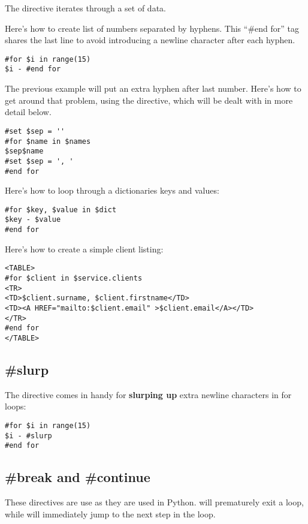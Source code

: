 The  directive iterates through a set of data.

Here's how to create list of numbers separated by hyphens. This ``\#end for''
tag shares the last line to avoid introducing a newline character after each
hyphen.  
\begin{verbatim}
#for $i in range(15)
$i - #end for
\end{verbatim}

The previous example will put an extra hyphen after last number.  Here's how to
get around that problem, using the  directive, which will be dealt
with in more detail below.
\begin{verbatim}
#set $sep = '' 
#for $name in $names 
$sep$name 
#set $sep = ', ' 
#end for 
\end{verbatim}

Here's how to loop through a dictionaries keys and values:
\begin{verbatim}
#for $key, $value in $dict
$key - $value
#end for
\end{verbatim}

Here's how to create a simple client listing:
\begin{verbatim}
<TABLE>
#for $client in $service.clients
<TR>
<TD>$client.surname, $client.firstname</TD>
<TD><A HREF="mailto:$client.email" >$client.email</A></TD>
</TR>
#end for
</TABLE>
\end{verbatim}


\subsection{\#slurp}
\label{directives.slurp}

The  directive comes in handy for {\bf slurping up} extra newline
characters in for loops:
\begin{verbatim}
#for $i in range(15)
$i - #slurp
#end for
\end{verbatim}

\subsection{\#break and \#continue}
\label{directives.break}

These directives are use as they are used in Python.  will
prematurely exit a  loop, while  will immediately
jump to the next step in the  loop.

